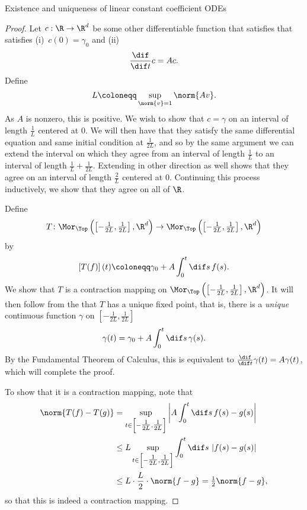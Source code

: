 \begin{thm}{Existence and uniqueness of linear constant coefficient ODEs}{}
\begin{proof}
Let $c:\R \rightarrow \R ^d$ be some other differentiable function that satisfies that satisfies (i)~$c(0)=\gamma _0$ and (ii)
\begin{equation}
\frac{\dif}{\dif t}c=Ac.
\end{equation}
Define
\begin{equation}
L\coloneqq \sup _{\norm{v}=1}\norm{Av}.
\end{equation}
As $A$ is nonzero, this is positive.  We wish to show that $c=\gamma$ on an interval of length $\frac{1}{L}$ centered at $0$.  We will then have that they satisfy the same differential equation and same initial condition at $\frac{1}{2L}$, and so by the same argument we can extend the interval on which they agree from an interval of length $\frac{1}{L}$ to an interval of length $\frac{1}{L}+\frac{1}{2L}$.  Extending in other direction as well shows that they agree on an interval of length $\frac{2}{L}$ centered at $0$.  Continuing this process inductively, we show that they agree on all of $\R$.

Define
\begin{equation*}
T\colon \Mor _{\Top}\left( \left[ -\tfrac{1}{2L},\tfrac{1}{2L}\right] ,\R ^d\right) \rightarrow \Mor _{\Top}\left( \left[ -\tfrac{1}{2L},\tfrac{1}{2L}\right] ,\R ^d\right)
\end{equation*}
by
\begin{equation}
\left[ T(f)\right] (t)\coloneqq \gamma _0+A\int _0^t\dif s\, f(s).
\end{equation}
We show that $T$ is a contraction mapping on $\Mor _{\Top}\left( \left[ -\frac{1}{2L},\frac{1}{2L}\right] ,\R ^d\right)$.  It will then follow from the  that $T$ has a unique fixed point, that is, there is a \emph{unique} continuous function $\gamma$ on $\left[ -\frac{1}{2L},\frac{1}{2L}\right]$
\begin{equation}
\gamma (t)=\gamma _0+A\int _0^t\dif s\, \gamma (s).
\end{equation}
By the Fundamental Theorem of Calculus, this is equivalent to $\frac{\dif}{\dif t}\gamma (t)=A\gamma (t)$, which will complete the proof.

To show that it is a contraction mapping, note that
\begin{equation}
\begin{split}
\norm{T(f)-T(g)} & =\sup _{t\in \left[ -\tfrac{1}{2L},\tfrac{1}{2L}\right]}\left| A\int _0^t\dif s\, f(s)-g(s)\right| \\
& \leq L\sup _{t\in \left[ -\tfrac{1}{2L},\tfrac{1}{2L}\right]}\int _0^t\dif s\, \left| f(s)-g(s)\right| \\
& \leq L\cdot \frac{L}{2}\cdot \norm{f-g}=\tfrac{1}{2}\norm{f-g},
\end{split}
\end{equation}
so that this is indeed a contraction mapping.
\end{proof}
\end{thm}
